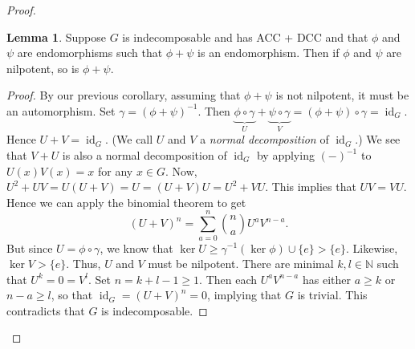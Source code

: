 \documentclass[10pt,letterpaper,cm]{nupset}
\theoremstyle{definition}
\theoremstyle{theorem}
\newtheorem{lemma}[definition]{Lemma}
\theoremstyle{remark}
\newcommand{\N}{\mathbb N}
\newcommand{\1}{\mathbf{1}}
\newcommand{\0}{\vec 0}
\DeclareMathOperator{\id}{id}
\begin{document}
\begin{proof}
\begin{lemma}
Suppose $G$ is indecomposable and has ACC + DCC and that $\phi$ and $\psi$ are endomorphisms such that $\phi + \psi$ is an endomorphism. Then if $\phi$ and $\psi$ are nilpotent, so is $\phi + \psi$.
\end{lemma}
\begin{proof}
By our previous corollary, assuming that $\phi + \psi$ is not nilpotent, it must be an automorphism. Set $\gamma = (\phi + \psi)^{-1}$. Then $\underbrace{\phi \circ \gamma}_U + \underbrace{\psi \circ \gamma}_V = (\phi +\psi) \circ \gamma = \id_G$. Hence $U + V = \id_G$. (We call $U$ and $V$ a \textit{normal decomposition} of $\id_G$.) We see that $V + U$ is also a normal decomposition of $\id_G$ by applying $(-)^{-1}$ to $U(x)V(x) =x$ for any $x \in G$.
Now, $U^2 + UV = U(U + V) = U = (U + V)U = U^2 + VU$. This implies that $UV = VU$. Hence we can apply the binomial theorem to get $$(U + V)^n = \sum_{a=0}^n{ {n}\choose {a}} U^aV^{n-a}.$$ But since $U = \phi \circ \gamma$, we know that $\ker U\geq \gamma^{-1}(\ker \phi) \cup \{e\} > \{e\}$. Likewise, $\ker V > \{e\}$. Thus, $U$ and $V$ must be nilpotent. There are minimal $k, l \in \N$ such that $U^k = 0 = V^l$. Set $n = k+l -1 \geq 1$. Then each $U^aV^{n-a}$ has either $a\geq k$ or $n-a\geq l$, so that $\id_G = (U+V)^n = 0$, implying that $G$ is trivial. This contradicts that $G$ is indecomposable.
\end{proof}


\end{proof}
\end{document}
